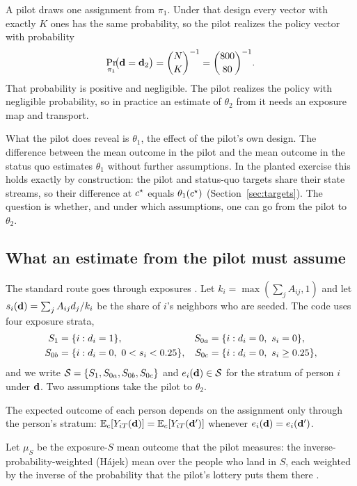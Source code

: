 A pilot draws one assignment from $\pi_1$. Under that design every vector with
exactly $K$ ones has the same probability, so the pilot realizes the policy vector
with probability
\begin{equation}
  \Pr_{\pi_1}\!\bigl(\mathbf{d}=\mathbf{d}_2\bigr)=\binom{N}{K}^{-1}
  =\binom{800}{80}^{-1}.
\end{equation}
That probability is positive and negligible. The pilot realizes the policy with
negligible probability, so in practice an estimate of $\theta_2$ from it needs an
exposure map and transport.

What the pilot does reveal is $\theta_1$, the effect of the pilot's own design.
The difference between the mean outcome in the pilot and the mean outcome in the
status quo estimates $\theta_1$ without further assumptions. In the planted
exercise this holds exactly by construction: the pilot and status-quo targets
share their state streams, so their difference at $c^\star$ equals
$\theta_1(c^\star)$ (Section~\ref{sec:targets}). The question is whether, and
under which assumptions, one can go from the pilot to $\theta_2$.

\subsection{What an estimate from the pilot must assume}\label{sec:assumptions}

The standard route goes through exposures \citep{aronow2017,leung2020}. Let
$k_i=\max(\sum_j A_{ij},1)$ and let $s_i(\mathbf{d})=\sum_j A_{ij}d_j/k_i$ be the
share of $i$'s neighbors who are seeded. The code uses four exposure strata,
\begin{align*}
  S_{1} &= \{i: d_i=1\}, &
  S_{0a} &= \{i: d_i=0,\ s_i=0\}, \\
  S_{0b} &= \{i: d_i=0,\ 0<s_i<0.25\}, &
  S_{0c} &= \{i: d_i=0,\ s_i\ge 0.25\},
\end{align*}
and we write $\mathcal{S}=\{S_{1},S_{0a},S_{0b},S_{0c}\}$ and $e_i(\mathbf{d})\in\mathcal{S}$ for the
stratum of person $i$ under $\mathbf{d}$. Two assumptions take the pilot to
$\theta_2$.

\begin{assumption}\label{ass:exposure}
The expected outcome of each person depends on the assignment only through the
person's stratum: $\mathbb{E}_c[Y_{iT}(\mathbf{d})]=\mathbb{E}_c[Y_{iT}(\mathbf{d}')]$
whenever $e_i(\mathbf{d})=e_i(\mathbf{d}')$.
\end{assumption}

Let $\mu_S$ be the exposure-$S$ mean outcome that the pilot measures: the
inverse-probability-weighted (H\'ajek) mean over the people who land in $S$, each
weighted by the inverse of the probability that the pilot's lottery puts them
there \citep{horvitz1952,aronow2017}.

